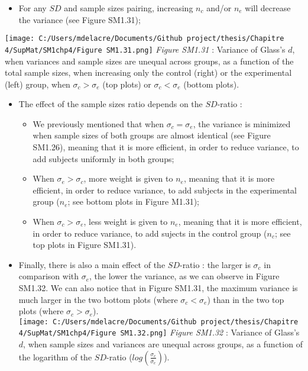 \documentclass[
  english,
  man,mask,floatsintext]{apa6}
\providecommand{\tightlist}{%
  \setlength{\itemsep}{0pt}\setlength{\parskip}{0pt}}
\begin{document}
\begin{itemize}
\tightlist
\item
  For any \(SD\) and sample sizes pairing, increasing \(n_c\) and/or \(n_e\) will decrease the variance (see Figure SM1.31);
\end{itemize}

\texttt{[image: C:/Users/mdelacre/Documents/Github project/thesis/Chapitre 4/SupMat/SM1chp4/Figure SM1.31.png]}
\emph{Figure SM1.31} : Variance of Glass's \(d\), when variances and sample sizes are unequal across groups, as a function of the total sample sizes, when increasing only the control (right) or the experimental (left) group, when \(\sigma_c > \sigma_e\) (top plots) or \(\sigma_c < \sigma_e\) (bottom plots).

\begin{itemize}
\tightlist
\item
  The effect of the sample sizes ratio depends on the \(SD\)-ratio :

  \begin{itemize}
  \tightlist
  \item
    We previously mentioned that when \(\sigma_c=\sigma_e\), the variance is minimized when sample sizes of both groups are almost identical (see Figure SM1.26), meaning that it is more efficient, in order to reduce variance, to add subjects uniformly in both groups;\\
  \item
    When \(\sigma_e > \sigma_c\), more weight is given to \(n_e\), meaning that it is more efficient, in order to reduce variance, to add subjects in the experimental group (\(n_e\); see bottom plots in Figure M1.31);\\
  \item
    When \(\sigma_c > \sigma_e\), less weight is given to \(n_e\), meaning that it is more efficient, in order to reduce variance, to add sujects in the control group (\(n_c\); see top plots in Figure SM1.31).
  \end{itemize}
\end{itemize}

\newpage

\begin{itemize}
\tightlist
\item
  Finally, there is also a main effect of the \(SD\)-ratio : the larger is \(\sigma_c\) in comparison with \(\sigma_e\), the lower the variance, as we can observe in Figure SM1.32. We can also notice that in Figure SM1.31, the maximum variance is much larger in the two bottom plots (where \(\sigma_c<\sigma_e\)) than in the two top plots (where \(\sigma_c>\sigma_e\)).\\
  \texttt{[image: C:/Users/mdelacre/Documents/Github project/thesis/Chapitre 4/SupMat/SM1chp4/Figure SM1.32.png]}
  \emph{Figure SM1.32} : Variance of Glass's \(d\), when sample sizes and variances are unequal across groups, as a function of the logarithm of the \(SD\)-ratio (\(log \left( \frac{\sigma_c}{\sigma_e} \right)\)).
\end{itemize}
\end{document}
